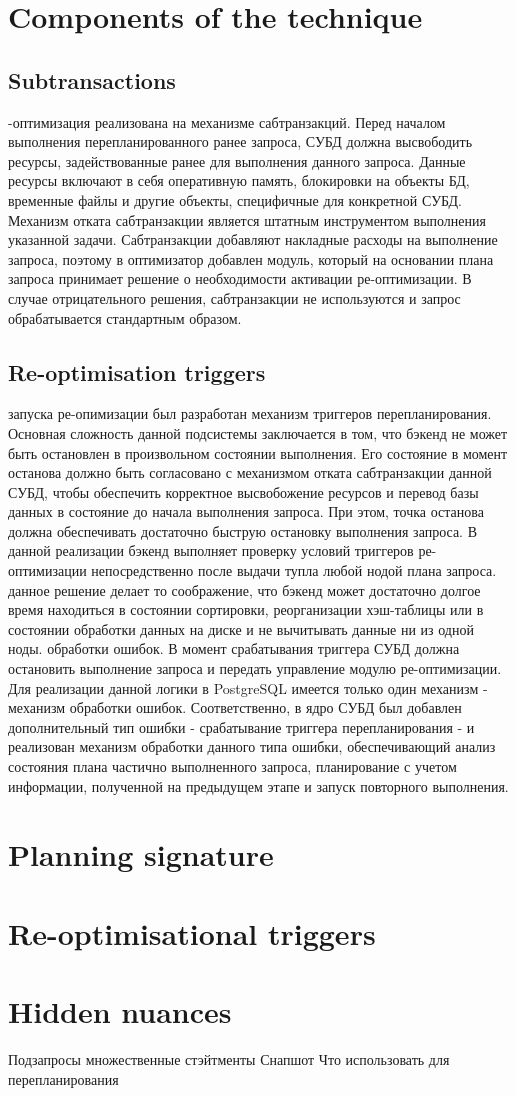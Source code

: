 \documentclass{article}
\begin{document}
\section{Components of the technique}
\subsection{Subtransactions}
-оптимизация реализована на механизме сабтранзакций. Перед началом выполнения перепланированного ранее запроса, СУБД должна высвободить ресурсы, задействованные ранее для выполнения данного запроса. Данные ресурсы включают в себя оперативную память, блокировки на объекты БД, временные файлы и другие объекты, специфичные для конкретной СУБД. Механизм отката сабтранзакции является штатным инструментом выполнения указанной задачи. Сабтранзакции добавляют накладные расходы на выполнение запроса, поэтому в оптимизатор добавлен модуль, который на основании плана запроса принимает решение о необходимости активации ре-оптимизации. В случае отрицательного решения, сабтранзакции не используются и запрос обрабатывается стандартным образом.
\subsection{Re-optimisation triggers}
 запуска ре-опимизации был разработан механизм триггеров перепланирования. Основная сложность данной подсистемы заключается в том, что бэкенд не может быть остановлен в произвольном состоянии выполнения. Его состояние в момент останова должно быть согласовано с механизмом отката сабтранзакции данной СУБД, чтобы обеспечить корректное высвобожение ресурсов и перевод базы данных в состояние до начала выполнения запроса. При этом, точка останова должна обеспечивать достаточно быструю остановку выполнения запроса. В данной реализации бэкенд выполняет проверку условий триггеров ре-оптимизации непосредственно после выдачи тупла любой нодой плана запроса.
 данное решение делает то соображение, что бэкенд может достаточно долгое время находиться в состоянии сортировки, реорганизации хэш-таблицы или в состоянии обработки данных на диске и не вычитывать данные ни из одной ноды.
 обработки ошибок. В момент срабатывания триггера СУБД должна остановить выполнение запроса и передать управление модулю ре-оптимизации. Для реализации данной логики в PostgreSQL имеется только один механизм - механизм обработки ошибок. Соответственно, в ядро СУБД был добавлен дополнительный тип ошибки - срабатывание триггера перепланирования - и реализован механизм обработки данного типа ошибки, обеспечивающий анализ состояния плана частично выполненного запроса, планирование с учетом информации, полученной на предыдущем этапе и запуск повторного выполнения.
\subsection{}
\section{Planning signature}
\section{Re-optimisational triggers}
\section{Hidden nuances}
Подзапросы
множественные стэйтменты
Снапшот
Что использовать для перепланирования


\end{document}
